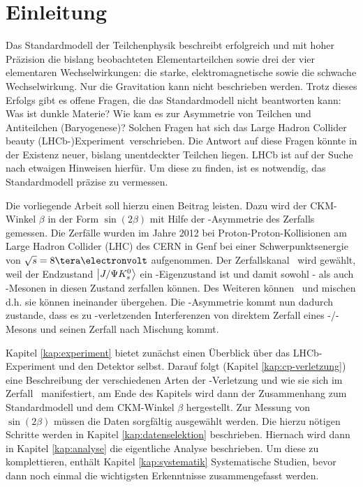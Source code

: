 \chapter{Einleitung}
Das Standardmodell der Teilchenphysik beschreibt erfolgreich und mit hoher Präzision die bislang beobachteten Elementarteilchen sowie drei der vier elementaren Wechselwirkungen: die starke, elektromagnetische sowie die schwache Wechselwirkung. Nur die Gravitation kann nicht beschrieben werden. Trotz dieses Erfolgs gibt es offene Fragen, die das Standardmodell nicht beantworten kann: Was ist dunkle Materie? Wie kam es zur Asymmetrie von Teilchen und Antiteilchen (Baryogenese)? Solchen Fragen hat sich das \glqq Large Hadron Collider beauty (LHCb-)Experiment\grqq\ verschrieben. Die Antwort auf diese Fragen könnte in der Existenz neuer, bislang unentdeckter Teilchen liegen. LHCb ist auf der Suche nach etwaigen Hinweisen hierfür.  Um diese zu finden, ist es notwendig, das Standardmodell präzise zu vermessen. \cite{cern-courier, roadmap}

Die vorliegende Arbeit soll hierzu einen Beitrag leisten. Dazu wird der CKM-Winkel $\beta$ in der Form $\sin(2\beta)$ mit Hilfe der \CP-Asymmetrie des Zerfalls \Decaychannel gemessen. Die Zerfälle wurden im Jahre 2012 bei Proton-Proton-Kollisionen am Large Hadron Collider (LHC) des CERN in Genf bei einer Schwerpunktsenergie von $\sqrt{s}=8\tera\electronvolt$ aufgenommen. Der Zerfallskanal \Decaychannel\ wird gewählt, weil der Endzustand $\Ket{J/\Psi K_s^0}$ ein \CP-Eigenzustand ist und damit sowohl \Bd- als auch \Bdbar-Mesonen in diesen Zustand zerfallen können. Des Weiteren können \Bd\ und \Bdbar \glqq mischen\grqq\, d.h. sie können ineinander übergehen. Die \CP-Asymmetrie kommt nun dadurch zustande, dass es zu \CP-verletzenden Interferenzen von direktem Zerfall eines \Bd-/\Bdbar-Mesons und seinen Zerfall nach Mischung kommt.

Kapitel \ref{kap:experiment} bietet zunächst einen Überblick über das LHCb-Experiment und den Detektor selbst. Darauf folgt (Kapitel \ref{kap:cp-verletzung}) eine Beschreibung der verschiedenen Arten der \CP-Verletzung und wie sie sich im Zerfall \Decaychannel\ manifestiert, am Ende des Kapitels wird dann der Zusammenhang zum Standardmodell und dem CKM-Winkel $\beta$ hergestellt. Zur Messung von $\sin(2\beta)$ müssen die Daten sorgfältig ausgewählt werden. Die hierzu nötigen Schritte werden in Kapitel \ref{kap:datenselektion} beschrieben. Hiernach wird dann in Kapitel \ref{kap:analyse} die eigentliche Analyse beschrieben. Um diese zu komplettieren, enthält Kapitel \ref{kap:systematik} Systematische Studien, bevor dann noch einmal die wichtigsten Erkenntnisse zusammengefasst werden.